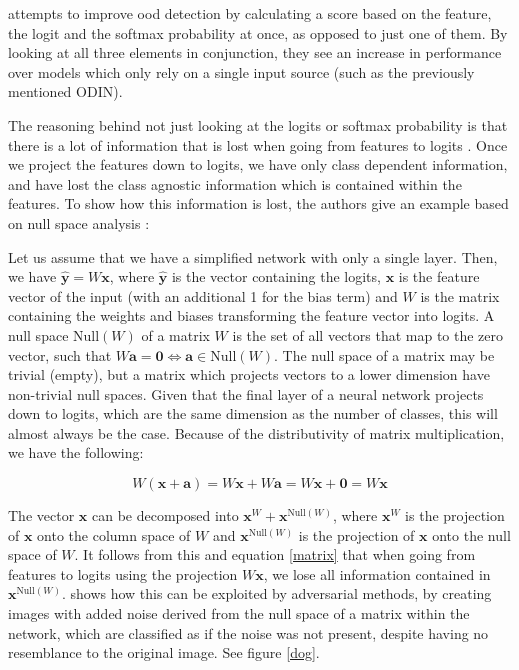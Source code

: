\documentclass[UKenglish]{uiomasterthesis} %
\theoremstyle{definition}
\begin{document}
\cite{vim} attempts to improve \ac{ood} detection by calculating a score based on the feature, the logit and the softmax probability at once, as opposed to just one of them. By looking at all three elements in conjunction, they see an increase in performance over models which only rely on a single input source (such as the previously mentioned ODIN).

The reasoning behind not just looking at the logits or softmax probability is that there is a lot of information that is lost when going from features to logits \cite{vim}. Once we project the features down to logits, we have only class dependent information, and have lost the class agnostic information which is contained within the features. To show how this information is lost, the authors give an example based on null space analysis \cite{nusa}:

Let us assume that we have a simplified network with only a single layer. Then, we have $\hat{\bm{y}} = W \bm{x}$, where $\hat{\bm{y}}$ is the vector containing the logits, $\bm{x}$ is the feature vector of the input (with an additional 1 for the bias term) and $W$ is the matrix containing the weights and biases transforming the feature vector into logits. A null space $\text{Null}(W)$ of a matrix $W$ is the set of all vectors that map to the zero vector, such that $W \bm{a} = \bm{0} \iff \bm{a} \in \text{Null}(W)$. The null space of a matrix may be trivial (empty), but a matrix which projects vectors to a lower dimension have non-trivial null spaces. Given that the final layer of a neural network projects down to logits, which are the same dimension as the number of classes, this will almost always be the case. Because of the distributivity of matrix multiplication, we have the following:

\begin{equation}
W (\bm{x} + \bm{a}) = W \bm{x} + W \bm{a} = W \bm{x} + \bm{0} = W \bm{x}
\label{matrix}
\end{equation}

The vector $\bm{x}$ can be decomposed into $\bm{x}^W + \bm{x}^{\text{Null}(W)}$, where $\bm{x}^W$ is the projection of $\bm{x}$ onto the column space of $W$ and $\bm{x}^{\text{Null}(W)}$ is the projection of $\bm{x}$ onto the null space of $W$. It follows from this and equation \ref{matrix} that when going from features to logits using the projection $W \bm{x}$, we lose all information contained in $\bm{x}^{\text{Null}(W)}$. \cite{nusa} shows how this can be exploited by adversarial methods, by creating images with added noise derived from the null space of a matrix within the network, which are classified as if the noise was not present, despite having no resemblance to the original image. See figure \ref{dog}.
\end{document}
